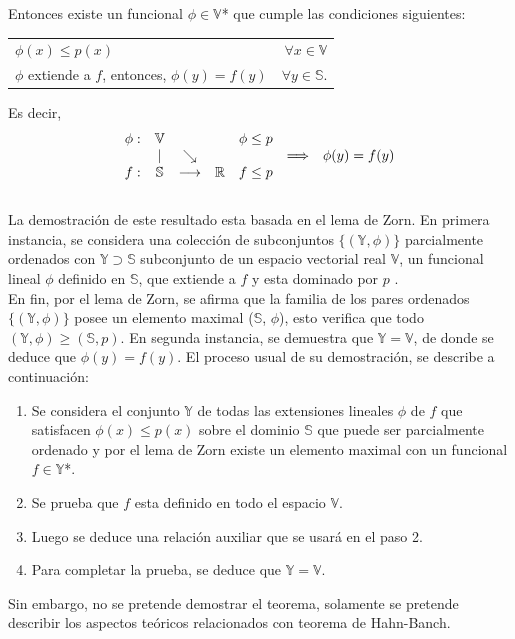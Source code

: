 \documentclass[10pt]{amsart}
\theoremstyle{remark}
\numberwithin{equation}{section}
\begin{document}
Entonces existe un funcional $\phi \in \mathbb{V}$*
que cumple las condiciones siguientes:\\
\begin{tabular}{l r}
$ \phi(x) \leq p(x)$ & $ \forall x \in \mathbb{V}$\\
$\phi$ extiende a $f$, entonces, $\phi(y) = f(y)$ & $\forall y \in \mathbb{S}$.\\[0.6cm]
\end{tabular} Es decir, 
\[%
\begin{array}[c]{c c c c c c l}%
\phi: & \mathbb{V} & & & \phi \leq p            & & \\
& \mid & \searrow & &                   & \Longrightarrow & \phi(y) = f(y)\\ 
f: & \mathbb{S} & \longrightarrow & \mathbb{R} & f \leq p & & \end{array} \]\\

La demostración de este resultado esta basada en el lema de Zorn. En primera instancia, se considera una colección de subconjuntos $\{(\mathbb{Y}, \phi)\}$ parcialmente ordenados con $\mathbb{Y} \supset \mathbb{S}$ subconjunto de un espacio vectorial real $\mathbb{V}$, un funcional lineal $\phi$ definido en $\mathbb{S}$, que extiende a $f$ y esta dominado por $p$ \cite{ArtAca01}.\\

En fin, por el lema de Zorn, se afirma que la familia de los pares ordenados $\{(\mathbb{Y}, \phi)\}$ posee un elemento maximal ($\mathbb{S}$, $\phi$), esto verifica que todo $(\mathbb{Y}, \phi) \geq (\mathbb{S}, p)$. En segunda instancia, se demuestra que $\mathbb{Y} = \mathbb{V}$, de donde se deduce que $\phi(y) = f(y)$. El proceso usual de su demostración, se describe a continuación: \cite{Lib19}\\ 
\begin{enumerate}
\item Se considera el conjunto $\mathbb{Y}$ de todas las extensiones lineales $\phi$ de $f$ que satisfacen $\phi(x) \leq p(x)$ sobre el dominio $\mathbb{S}$ que puede ser parcialmente ordenado y por el lema de Zorn
existe un elemento maximal con un funcional $f \in \mathbb{Y}$*.

\item Se prueba que $f$ esta definido en todo el espacio $\mathbb{V}$. \item Luego se deduce una relación auxiliar que se usará en el paso 2. 

\item Para completar la prueba, se deduce que $\mathbb{Y} = \mathbb{V}$.\\
\end{enumerate} 
Sin embargo, no se pretende demostrar el teorema, solamente se pretende describir los aspectos teóricos relacionados con teorema de Hahn-Banch.\\
\end{document}
